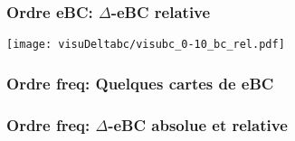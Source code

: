 \documentclass[aspectratio=169]{beamer}
\begin{document}
    \begin{frame}
        \centering
        \frametitle{Ordre eBC: $\Delta$-eBC relative}
        \texttt{[image: visuDeltabc/visubc\_0-10\_bc\_rel.pdf]}
    \end{frame}
    
    \begin{frame}
        \frametitle{Ordre freq: Quelques cartes de eBC}
    \end{frame}

    \begin{frame}
        \frametitle{Ordre freq: $\Delta$-eBC absolue et relative}
    \end{frame}
    


\end{document}
